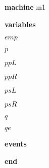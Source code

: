 \begin{block}
  \item   \textbf{machine} m1
  \item   \textbf{variables}
  \begin{block}
    \item   $emp$
    \item   $p$
    \item   $ppL$
    \item   $ppR$
    \item   $psL$
    \item   $psR$
    \item   $q$
    \item   $qe$
  \end{block}
  \item   \textbf{events}
  \begin{block}
    \item   
    \item   
    \item   
    \item   
    \item   
    \item   
    \item   
    \item   
    \item   
    \item   
  \end{block}
  \item   \textbf{end} \\
\end{block}
